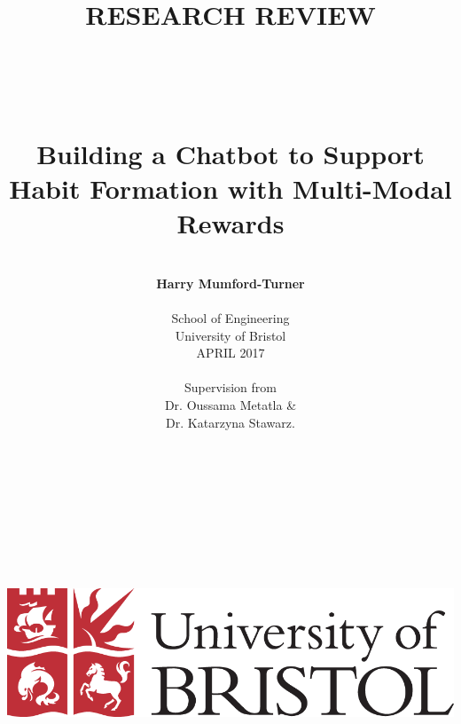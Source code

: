 
\date{} %
\title{\large{RESEARCH REVIEW}
\\
\huge{\textbf{\\\\\\Building a Chatbot to Support Habit Formation with Multi-Modal Rewards}}}
\author{\\
\textbf{Harry Mumford-Turner}\\
\\
School of Engineering\\
University of Bristol\\
APRIL 2017\\
\\
Supervision from\\
Dr. Oussama Metatla \&\\Dr. Katarzyna Stawarz.
\\
\\\\
\\
\\
\\
\\
\\
\\
\\
\includegraphics[scale=0.29]{resources/UoB-logo.png}}
